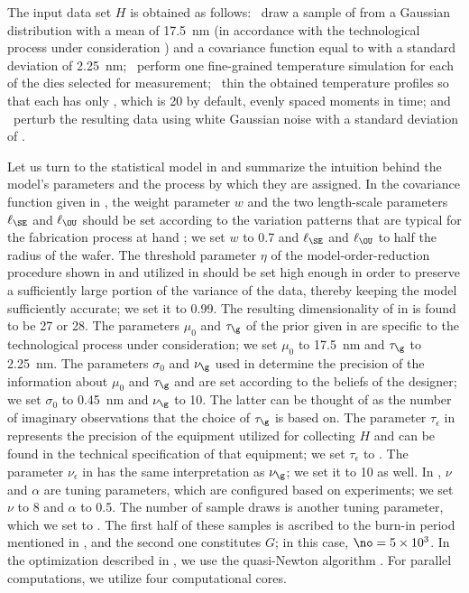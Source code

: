 The input data set $H$ is obtained as follows: \one~draw a sample of \g from a
Gaussian distribution with a mean of 17.5~nm (in accordance with the
technological process under consideration \cite{ptm}) and a covariance function
equal to  with a standard deviation of 2.25~nm;
\two~perform one fine-grained temperature simulation for each of the \hnd dies
selected for measurement; \three~thin the obtained temperature profiles so that
each has only \ns, which is 20 by default, evenly spaced moments in time; and
\four~perturb the resulting data using white Gaussian noise with a standard
deviation of .

Let us turn to the statistical model in  and
summarize the intuition behind the model's parameters and the process by which
they are assigned. In the covariance function given in ,
the weight parameter $w$ and the two length-scale parameters $\ell_\SE$ and
$\ell_\OU$ should be set according to the variation patterns that are typical
for the fabrication process at hand \cite{chandrakasan2000, cheng2011}; we set
$w$ to 0.7 and $\ell_\SE$ and $\ell_\OU$ to half the radius of the wafer. The
threshold parameter $\eta$ of the model-order-reduction procedure shown in
 and utilized in  should be set high
enough in order to preserve a sufficiently large portion of the variance of the
data, thereby keeping the model sufficiently accurate; we set it to 0.99. The
resulting dimensionality \nz of \vz in  is found to be 27
or 28. The parameters $\mu_0$ and $\tau_\g$ of the prior given in
 are specific to the technological process under
consideration; we set $\mu_0$ to 17.5~nm and $\tau_\g$ to 2.25~nm. The
parameters $\sigma_0$ and $\nu_\g$ used in  determine the
precision of the information about $\mu_0$ and $\tau_\g$ and are set according
to the beliefs of the designer; we set $\sigma_0$ to 0.45~nm and $\nu_\g$ to 10.
The latter can be thought of as the number of imaginary observations that the
choice of $\tau_\g$ is based on. The parameter $\tau_\epsilon$ in
 represents the precision of the equipment utilized for
collecting $H$ and can be found in the technical specification of that
equipment; we set $\tau_\epsilon$ to . The parameter $\nu_\epsilon$
in  has the same interpretation as $\nu_\g$; we set it to 10
as well. In , $\nu$ and $\alpha$ are tuning parameters,
which are configured based on experiments; we set $\nu$ to 8 and $\alpha$ to
0.5. The number of sample draws is another tuning parameter, which we set to
. The first half of these samples is ascribed to the burn-in period
mentioned in , and the second one constitutes $G$; in
this case, $\no = 5 \times 10^3$. In the optimization described in
, we use the quasi-Newton algorithm \cite{press2007}.
For parallel computations, we utilize four computational cores.

